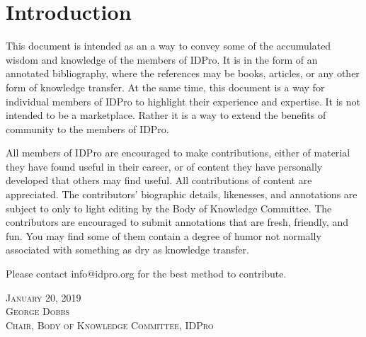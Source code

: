 \section{Introduction}
This document is intended as an a way to convey some of the accumulated wisdom and knowledge of the members of IDPro.
It is in the form of an annotated bibliography, where the references may be books, articles, or any other form of knowledge transfer.  At the same time, this document is a way for individual members of IDPro to highlight their experience and expertise.  It is not intended to be a marketplace.  Rather it is a way to extend the benefits of community to the members of IDPro.

All members of IDPro are encouraged to make contributions, either of material they have found useful in their career, or of content they have personally developed that others may find useful.  All contributions of content are appreciated. The contributors' biographic details, likenesses, and annotations are subject to only to light editing by the Body of Knowledge Committee.  The contributors are encouraged to submit annotations that are fresh, friendly, and fun. You may find some of them contain a degree of humor not normally associated with something as dry as knowledge transfer.

Please contact info@idpro.org for the best method to contribute.

\vspace{24pt}
{\setlength{\parindent}{0cm}
\textsc{
January 20, 2019\\
George Dobbs\\
Chair, Body of Knowledge Committee, IDPro}
}
